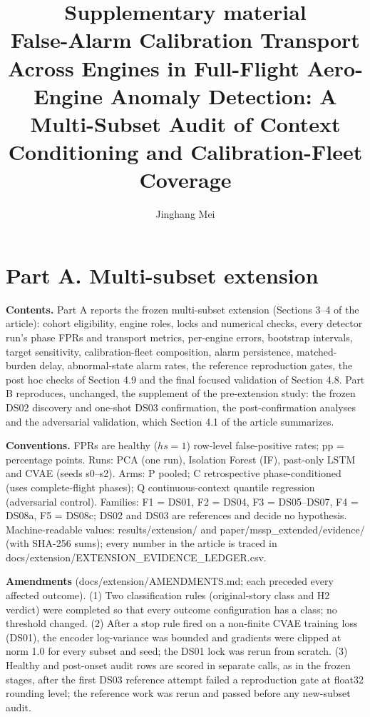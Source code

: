 \documentclass[10pt]{article}
\title{Supplementary material\\[4pt]\large False-Alarm Calibration Transport Across Engines in Full-Flight Aero-Engine
Anomaly Detection: A Multi-Subset Audit of Context Conditioning and Calibration-Fleet Coverage}
\author{Jinghang Mei}
\date{}
\begin{document}
\maketitle

\section*{Part A. Multi-subset extension}
\noindent\textbf{Contents.} Part A reports the frozen multi-subset extension (Sections 3--4 of the article): cohort
eligibility, engine roles, locks and numerical checks, every detector run's phase FPRs and transport metrics, per-engine
errors, bootstrap intervals, target sensitivity, calibration-fleet composition, alarm persistence, matched-burden delay,
abnormal-state alarm rates, the reference reproduction gates, the post hoc checks of Section 4.9 and the final focused validation of Section 4.8. Part B reproduces, unchanged, the supplement of the
pre-extension study: the frozen DS02 discovery and one-shot DS03 confirmation, the post-confirmation analyses and the
adversarial validation, which Section 4.1 of the article summarizes.

\noindent\textbf{Conventions.} FPRs are healthy ($hs = 1$) row-level false-positive rates; pp = percentage points. Runs:
PCA (one run), Isolation Forest (IF), past-only LSTM and CVAE (seeds s0--s2). Arms: P pooled; C retrospective
phase-conditioned (uses complete-flight phases); Q continuous-context quantile regression (adversarial control). Families:
F1 = DS01, F2 = DS04, F3 = DS05--DS07, F4 = DS08a, F5 = DS08c; DS02 and DS03 are references and decide no hypothesis.
Machine-readable values: results/extension/ and paper/mssp\_extended/evidence/ (with SHA-256 sums); every number in the
article is traced in docs/extension/EXTENSION\_EVIDENCE\_LEDGER.csv.

\noindent\textbf{Amendments} (docs/extension/AMENDMENTS.md; each preceded every affected outcome). (1) Two classification
rules (original-story class and H2 verdict) were completed so that every outcome configuration has a class; no threshold
changed. (2) After a stop rule fired on a non-finite CVAE training loss (DS01), the encoder log-variance was bounded and
gradients were clipped at norm 1.0 for every subset and seed; the DS01 lock was rerun from scratch. (3) Healthy and
post-onset audit rows are scored in separate calls, as in the frozen stages, after the first DS03 reference attempt failed a
reproduction gate at float32 rounding level; the reference work was rerun and passed before any new-subset audit.
\end{document}

